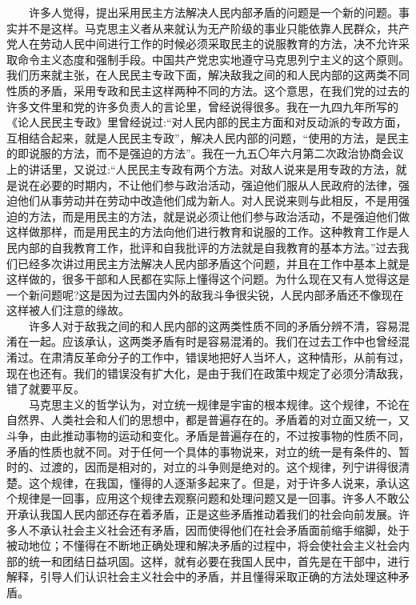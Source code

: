 \documentclass[cn,11pt,chinese]{elegantbook}
\begin{document}
　　许多人觉得，提出采用民主方法解决人民内部矛盾的问题是一个新的问题。事实并不是这样。马克思主义者从来就认为无产阶级的事业只能依靠人民群众，共产党人在劳动人民中间进行工作的时候必须采取民主的说服教育的方法，决不允许采取命令主义态度和强制手段。中国共产党忠实地遵守马克思列宁主义的这个原则。我们历来就主张，在人民民主专政下面，解决敌我之间的和人民内部的这两类不同性质的矛盾，采用专政和民主这样两种不同的方法。这个意思，在我们党的过去的许多文件里和党的许多负责人的言论里，曾经说得很多。我在一九四九年所写的《论人民民主专政》里曾经说过:“对人民内部的民主方面和对反动派的专政方面，互相结合起来，就是人民民主专政”，解决人民内部的问题，“使用的方法，是民主的即说服的方法，而不是强迫的方法”。我在一九五〇年六月第二次政治协商会议上的讲话里，又说过:“人民民主专政有两个方法。对敌人说来是用专政的方法，就是说在必要的时期内，不让他们参与政治活动，强迫他们服从人民政府的法律，强迫他们从事劳动并在劳动中改造他们成为新人。对人民说来则与此相反，不是用强迫的方法，而是用民主的方法，就是说必须让他们参与政治活动，不是强迫他们做这样做那样，而是用民主的方法向他们进行教育和说服的工作。这种教育工作是人民内部的自我教育工作，批评和自我批评的方法就是自我教育的基本方法。”过去我们已经多次讲过用民主方法解决人民内部矛盾这个问题，并且在工作中基本上就是这样做的，很多干部和人民都在实际上懂得这个问题。为什么现在又有人觉得这是一个新问题呢?这是因为过去国内外的敌我斗争很尖锐，人民内部矛盾还不像现在这样被人们注意的缘故。\\
　　许多人对于敌我之间的和人民内部的这两类性质不同的矛盾分辨不清，容易混淆在一起。应该承认，这两类矛盾有时是容易混淆的。我们在过去工作中也曾经混淆过。在肃清反革命分子的工作中，错误地把好人当坏人，这种情形，从前有过，现在也还有。我们的错误没有扩大化，是由于我们在政策中规定了必须分清敌我，错了就要平反。\\
　　马克思主义的哲学认为，对立统一规律是宇宙的根本规律。这个规律，不论在自然界、人类社会和人们的思想中，都是普遍存在的。矛盾着的对立面又统一，又斗争，由此推动事物的运动和变化。矛盾是普遍存在的，不过按事物的性质不同，矛盾的性质也就不同。对于任何一个具体的事物说来，对立的统一是有条件的、暂时的、过渡的，因而是相对的，对立的斗争则是绝对的。这个规律，列宁讲得很清楚。这个规律，在我国，懂得的人逐渐多起来了。但是，对于许多人说来，承认这个规律是一回事，应用这个规律去观察问题和处理问题又是一回事。许多人不敢公开承认我国人民内部还存在着矛盾，正是这些矛盾推动着我们的社会向前发展。许多人不承认社会主义社会还有矛盾，因而使得他们在社会矛盾面前缩手缩脚，处于被动地位；不懂得在不断地正确处理和解决矛盾的过程中，将会使社会主义社会内部的统一和团结日益巩固。这样，就有必要在我国人民中，首先是在干部中，进行解释，引导人们认识社会主义社会中的矛盾，并且懂得采取正确的方法处理这种矛盾。\\
\end{document}
